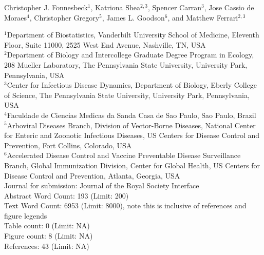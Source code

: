 Christopher J. Fonnesbeck$^{1}$, Katriona Shea$^{2,3}$, Spencer Carran$^{3}$, Jose Cassio de Moraes$^{4}$, Christopher Gregory$^{5}$, James L. Goodson$^{6}$, and Matthew Ferrari$^{2,3}$

$^{1}$Department of Biostatistics, Vanderbilt University School of Medicine, Eleventh Floor, Suite 11000, 2525 West End Avenue, Nashville, TN, USA \\
$^{2}$Department of Biology and Intercollege Graduate Degree Program in Ecology, 208 Mueller Laboratory, The Pennsylvania State University, University Park, Pennsylvania, USA \\
$^{3}$Center for Infectious Disease Dynamics, Department of Biology, Eberly College of Science, The Pennsylvania State University, University Park, Pennsylvania, USA \\
$^{4}$Faculdade de Ciencias Medicas da Sanda Casa de Sao Paulo, Sao Paulo, Brazil \\
$^{5}$Arboviral Diseases Branch, Division of Vector-Borne Diseases, National Center for Enteric and Zoonotic Infectious Diseases, US Centers for Disease Control and Prevention, Fort Collins, Colorado, USA \\
$^{6}$Accelerated Disease Control and Vaccine Preventable Disease Surveillance Branch, Global Immunization Division, Center for Global Health, US Centers for Disease Control and Prevention, Atlanta, Georgia, USA \\

Journal for submission: Journal of the Royal Society Interface\\
Abstract Word Count: 193 (Limit: 200)\\
Text Word Count: 6953 (Limit: 8000), note this is inclusive of references and figure legends\\
Table count: 0 (Limit: NA)\\
Figure count: 8 (Limit: NA)\\
References: 43 (Limit: NA)
